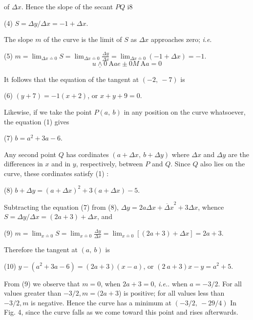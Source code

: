 \documentclass[12pt]{article}
\begin{document}
of $\Delta x$. Hence the slope of
the secant $PQ$ i8
\begin{center}
(4)   $S=\Delta y/\Delta x=-1+\Delta x$.
\end{center}
The slope $m$ of the curve is the limit of $S$ as $\Delta x$ approaches zero; {\it i.e}.
\begin{center}
(5)   $m=\displaystyle \lim_{\Delta x \doteq 0} S=
\lim_{\Delta x \doteq 0}\frac{\Delta y}{\Delta x}=
\lim_{\Delta x \doteq 0}(-1+\Delta x)=-1$.
$$
u\underline{\wedge}0\ \mathrm{A}ae\pm 0M\ \mathrm{A}a=0
$$
\end{center}
It follows that the equation of the tangent at $(-2,\ -7)$ is
\begin{center}
(6)   $(y+7)=-1(x+2)$, or $x+y+9=0$.
\end{center}
Likewise, if we take the point $P(a,\ b)$ in any position on the curve
whatsoever, the equation (1) gives
\begin{center}
(7)   $b=a^{2}+3a-6$.
\end{center}
Any second point $Q$ has cordinates $(a+\Delta x,\ b+\Delta y)$ where $\Delta x$ and $\Delta y$ are the differences in $x$ and in $y$, respectively, 
between $P$ and $Q$. Since $Q$ also lies on the curve, these 
cordinates satisfy (1) :

\begin{center}
(8)   $b+\Delta y=(a+\Delta x)^{2}+3(a+\Delta x)-5$.
\end{center}
Subtracting the equation (7) from (8),
$\Delta y=2a\Delta x+{\overline\Delta x}^{2}+3\Delta x$, whence $S=\Delta y/\Delta x=(2 a + 3)+ \Delta x$,
and
\begin{center}
(9)   $m=\displaystyle \lim_{x\doteq 0}S=
\lim_{x\doteq 0}\frac{\Delta y}{\Delta x}=
\lim_{x\doteq 0}[(2a+3)+\Delta x]=2a+3$.
\end{center}
Therefore the tangent at $(a,\ b)$ is
\begin{center}
(10) $y-(a^{2}+3a-6)=(2a+3)(x-a)$, or $(2\ a+3)x-y=a^{2}+5$.
\end{center}
From (9) we observe that $m=0$, when $2a+3=0$, {\it i.e.}. when $a=-3/2$.
For all values greater than $-3/2, m=(2a+3$) is positive; for all
values less than $-3/2, m$ is negative. Hence the curve has a minimum
at $(-3/2,\ -29/4)$ In Fig. 4, since the curve falls as we come toward
this point and rises afterwards.
\end{document}
